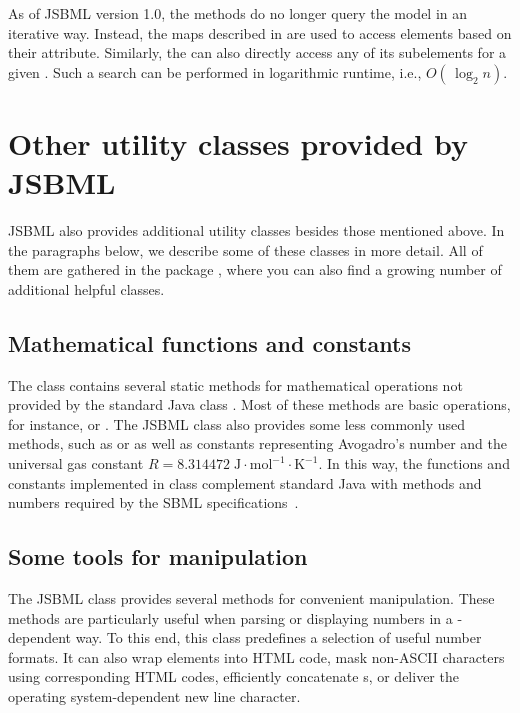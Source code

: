 As of JSBML version 1.0, the  methods do no longer query the
model in an iterative way. Instead, the maps described in
 are used to access elements based on their 
attribute. Similarly, the \SBMLDocument can also directly access any of its
subelements for a given . Such a search can be performed in
logarithmic runtime, i.e., $O(\,\log_2 n)$.


\section{Other utility classes provided by JSBML}

JSBML also provides additional utility classes besides those mentioned
above. In the paragraphs below, we describe some of these classes in more
detail.  All of them are gathered in the package
, where you can also find a growing number of
additional helpful classes.

\subsection{Mathematical functions and constants}

The class 
%
contains several static methods for mathematical operations not provided by
the standard Java class . Most of these methods are
basic operations, for instance,  or .  The JSBML class  also provides some less commonly used
methods, such as  or  as well as
 constants representing Avogadro's number and the universal
gas constant
$R = 8.314472\;\mathrm{J}\cdot\mathrm{mol}^{-1}\cdot\mathrm{K}^{-1}$.
In this way, the functions and constants implemented in class 
complement standard Java with methods and numbers required by the SBML
specifications~\citep{Hucka2003, Hucka2008, Hucka2010a}.

\subsection{Some tools for  manipulation}

The JSBML class \StringTools provides several methods for convenient
\String manipulation. These methods are particularly useful when parsing or
displaying  numbers in a \hyp{}dependent way. To
this end, this class predefines a selection of useful number formats. It
can also wrap \String elements into HTML code, mask non-ASCII characters
using corresponding HTML codes, efficiently concatenate \String{}s, or
deliver the operating system-dependent new line character.


